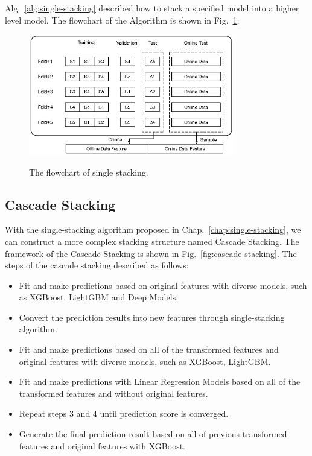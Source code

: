 \documentclass[12pt]{article}
\begin{document}
Alg.~{\ref{alg:single-stacking}} described how to stack a specified model into a higher level model. The flowchart of the Algorithm is shown in Fig.~{\ref{fig:single-stacking}}.


\begin{figure}[ht]
  \centering
  \includegraphics[width=0.8\textwidth]{../img/single-stacking}\\
  \caption{The flowchart of single stacking.}
  \label{fig:single-stacking}
\end{figure}

\subsection{Cascade Stacking}

With the single-stacking algorithm proposed in Chap.~{\ref{chap:single-stacking}}, we can construct a more complex stacking structure named Cascade Stacking. The framework of the Cascade Stacking is shown in Fig.~{\ref{fig:cascade-stacking}}. The steps of the cascade stacking described as follows:

\begin{itemize}
\label{alg:cascade-stacking}
\item[1.] Fit and make predictions based on original features with diverse models, such as XGBoost, LightGBM and Deep Models.
\item[2.] Convert the prediction results into new features through single-stacking algorithm.
\item[3.] Fit and make predictions based on all of the transformed features and original features with diverse models, such as XGBoost, LightGBM.
\item[4.] Fit and make predictions with Linear Regression Models based on all of the transformed features and without original features.
\item[5.] Repeat steps 3 and 4 until prediction score is converged.
\item[6.] Generate the final prediction result based on all of previous transformed features and original features with XGBoost.
\end{itemize}
\end{document}
